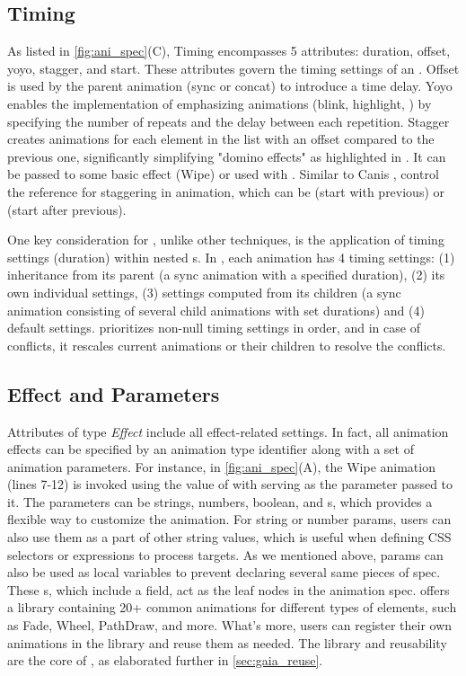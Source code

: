 \subsection{Timing}
\label{ssec:gaia_ani_timing}

As listed in \autoref{fig:ani_spec}(C), Timing encompasses 5 attributes: duration, offset, yoyo, stagger, and start.
These attributes govern the timing settings of an \aniunit{}.
Offset is used by the parent animation (\eg sync or concat) to introduce a time delay.
Yoyo enables the implementation of emphasizing animations (\eg blink, highlight, \etcns) by specifying the number of repeats and the delay between each repetition.
Stagger creates animations for each element in the list with an offset compared to the previous one, significantly simplifying "domino effects" as highlighted in \cite{shi2021communicating}.
It can be passed to some basic effect (\eg Wipe) or used with .
Similar to Canis \cite{ge2020canis},  control the reference for staggering in  animation, which can be  (start with previous) or  (start after previous).

One key consideration for \gaia{}, unlike other techniques, is the application of timing settings (\ie duration) within nested \aniunit{}s.
In \gaia{}, each animation has 4 timing settings: 
(1) inheritance from its parent (\eg a sync animation with a specified duration), 
(2) its own individual settings, 
(3) settings computed from its children (\eg a sync animation consisting of several child animations with set durations) and 
(4) default settings.
\gaia{} prioritizes non-null timing settings in order, and in case of conflicts, it rescales current animations or their children to resolve the conflicts.


\subsection{Effect and Parameters}
\label{ssec:gaia_ani_effect}

Attributes of type \textit{Effect} include all effect-related settings.
In fact, all animation effects can be specified by an animation type identifier along with a set of animation parameters.
For instance, in \autoref{fig:ani_spec}(A), the Wipe animation (lines 7-12) is invoked using the value of  with  serving as the parameter passed to it. 
The parameters can be strings, numbers, boolean, and \aniunit{}s, which provides a flexible way to customize the animation.
For string or number params, users can also use them as a part of other string values, which is useful when defining CSS selectors or expressions to process targets.
As we mentioned above, params can also be used as local variables to prevent declaring several same pieces of spec.
These \aniunit{}s, which include a  field, act as the leaf nodes in the animation spec. 
\gaia{} offers a library containing 20+ common animations for different types of elements, such as Fade, Wheel, PathDraw, and more. 
What's more, users can register their own animations in the library and reuse them as needed. 
The library and reusability are the core of \gaia{}, as elaborated further in \autoref{sec:gaia_reuse}.

